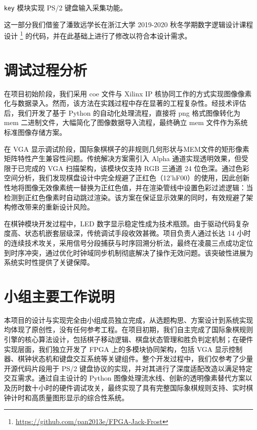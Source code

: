 \documentclass[a4paper, 12pt]{article}
\begin{document}
            \texttt{key} 模块实现 PS/2 键盘输入采集功能。

            这一部分我们借鉴了潘致远学长在浙江大学 2019-2020 秋冬学期数字逻辑设计课程设计 \footnote{\href{https://github.com/pan2013e/FPGA-Jack-Frost}{https://github.com/pan2013e/FPGA-Jack-Frost}} 的代码，并在此基础上进行了修改以符合本设计需求。

    \section{调试过程分析}

        在项目初始阶段，我们采用 coe 文件与 Xilinx IP 核协同工作的方式实现图像像素化与数据录入。然而，该方法在实践过程中存在显著的工程复杂性。经技术评估后，我们开发了基于 Python 的自动化处理流程，直接将 png 格式图像转化为 mem 二进制文件，大幅简化了图像数据导入流程，最终确立 mem 文件作为系统标准图像存储方案。

        在 VGA 显示调试阶段，国际象棋棋子的非规则几何形状与MEM文件的矩形像素矩阵特性产生兼容性问题。传统解决方案需引入 Alpha 通道实现透明效果，但受限于已完成的 VGA 扫描架构，该模块仅支持 RGB 三通道 24 位色深。通过色彩空间分析，我们发现棋盘设计中完全规避了正红色（12'hF00）的使用，因此创新性地将图像无效像素统一替换为正红色值，并在渲染管线中设置色彩过滤逻辑：当检测到正红色像素时自动跳过渲染。该方案在保证显示效果的同时，有效规避了架构修改带来的重新设计风险。

        在棋钟模块开发过程中，LED 数字显示稳定性成为技术瓶颈。由于驱动代码复杂度高、状态机嵌套层级深，传统调试手段收效甚微。项目负责人通过长达 14 小时的连续技术攻关，采用信号分段捕获与时序回溯分析法，最终在凌晨三点成功定位到时序冲突，通过优化时钟域同步机制彻底解决了操作无效问题。该突破性进展为系统实时性提供了关键保障。

    \section{小组主要工作说明}

        本项目的设计与实现完全由小组成员独立完成，从选题构思、方案设计到系统实现均体现了原创性，没有任何参考工程。在项目初期，我们自主完成了国际象棋规则引擎的核心算法设计，包括棋子移动逻辑、棋盘状态管理和胜负判定机制；在硬件实现层面，我们独立开发了 FPGA 上的多模块协同架构，包括 VGA 显示控制器、棋钟状态机和键盘交互系统等关键组件。整个开发过程中，我们仅参考了少量开源代码片段用于 PS/2 键盘协议的实现，并对其进行了深度适配改造以满足特定交互需求。通过自主设计的 Python 图像处理流水线、创新的透明像素替代方案以及历时数十小时的硬件调试攻关，最终实现了具有完整国际象棋规则支持、实时棋钟计时和高质量图形显示的综合性系统。
        
\end{document}
